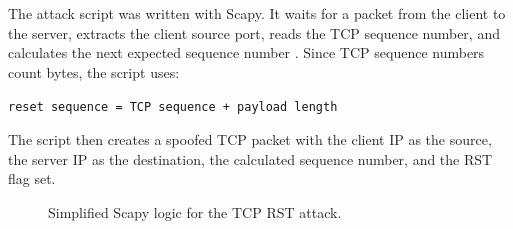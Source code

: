 The attack script was written with Scapy. It waits for a packet from the client to the server, extracts the client source port, reads the TCP sequence number, and calculates the next expected sequence number \cite{rfc9293,heaton2020}. Since TCP sequence numbers count bytes, the script uses:

\begin{center}
\texttt{reset sequence = TCP sequence + payload length}
\end{center}

The script then creates a spoofed TCP packet with the client IP as the source, the server IP as the destination, the calculated sequence number, and the RST flag set.

\begin{figure}[H]
\centering
{}
\caption{Simplified Scapy logic for the TCP RST attack.}
\label{fig:rst_scapy}
\end{figure}


